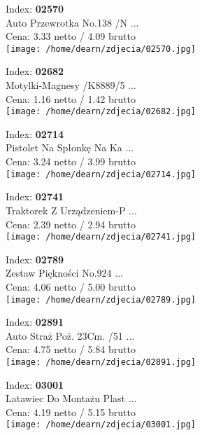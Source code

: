 {Index: \textbf{02570}\\
Auto Przewrotka No.138 /N ...\\
Cena: 3.33 netto / 4.09 brutto\\
  \texttt{[image: /home/dearn/zdjecia/02570.jpg]}}\newline\newline

{Index: \textbf{02682}\\
Motylki-Magnesy  /K8889/5 ...\\
Cena: 1.16 netto / 1.42 brutto\\
  \texttt{[image: /home/dearn/zdjecia/02682.jpg]}}\newline\newline

{Index: \textbf{02714}\\
Pistolet Na Spłonkę Na Ka ...\\
Cena: 3.24 netto / 3.99 brutto\\
  \texttt{[image: /home/dearn/zdjecia/02714.jpg]}}\newline\newline

{Index: \textbf{02741}\\
Traktorek Z Urządzeniem-P ...\\
Cena: 2.39 netto / 2.94 brutto\\
  \texttt{[image: /home/dearn/zdjecia/02741.jpg]}}\newline\newline

{Index: \textbf{02789}\\
Zestaw Piękności No.924   ...\\
Cena: 4.06 netto / 5.00 brutto\\
  \texttt{[image: /home/dearn/zdjecia/02789.jpg]}}\newline\newline

{Index: \textbf{02891}\\
Auto Straż Poż. 23Cm. /51 ...\\
Cena: 4.75 netto / 5.84 brutto\\
  \texttt{[image: /home/dearn/zdjecia/02891.jpg]}}\newline\newline

{Index: \textbf{03001}\\
Latawiec Do Montażu Plast ...\\
Cena: 4.19 netto / 5.15 brutto\\
  \texttt{[image: /home/dearn/zdjecia/03001.jpg]}}\newline\newline

